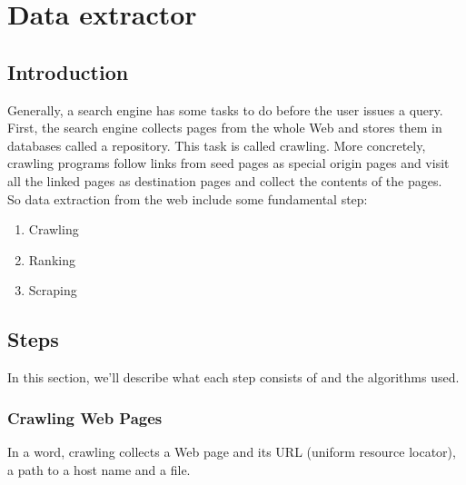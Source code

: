 \documentclass[12pt, a4paper]{report}
\begin{document}
\chapter{Data extractor}
\section{Introduction}
Generally, a search engine has some tasks to do before the user issues
a query. First, the search engine collects pages from the whole Web and
stores them in databases called a repository. This task is called crawling. More concretely, crawling programs follow links from seed pages as special origin pages and visit all the linked pages as destination pages and collect the contents of the pages.\\
So data extraction from the web include some fundamental step:
\begin{enumerate}
    \item Crawling
    \item Ranking
    \item Scraping
\end{enumerate}
\section{Steps}
In this section, we'll describe what each step consists of and  the algorithms used.
\subsection{Crawling Web Pages}
In a word, crawling collects a Web page and its URL (uniform resource
locator), a path to a host name and a file.
\end{document}

